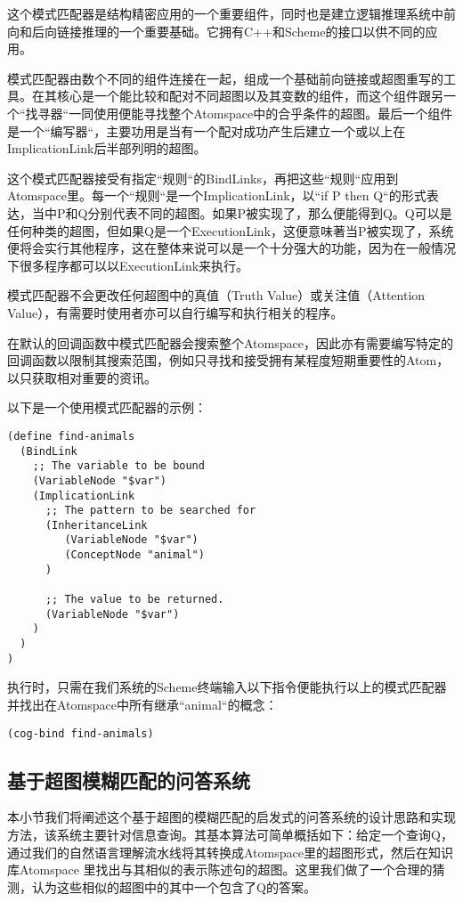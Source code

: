 这个模式匹配器是结构精密应用的一个重要组件，同时也是建立逻辑推理系统中前向和后向链接推理的一个重要基础。它拥有C++和Scheme的接口以供不同的应用。

模式匹配器由数个不同的组件连接在一起，组成一个基础前向链接或超图重写的工具。在其核心是一个能比较和配对不同超图以及其变数的组件，而这个组件跟另一个“找寻器“一同使用便能寻找整个Atomspace中的合乎条件的超图。最后一个组件是一个“编写器“，主要功用是当有一个配对成功产生后建立一个或以上在ImplicationLink后半部列明的超图。

这个模式匹配器接受有指定“规则“的BindLinks，再把这些“规则“应用到Atomspace里。每一个“规则“是一个ImplicationLink，以“if P then Q“的形式表达，当中P和Q分别代表不同的超图。如果P被实现了，那么便能得到Q。Q可以是任何种类的超图，但如果Q是一个ExecutionLink，这便意味著当P被实现了，系统便将会实行其他程序，这在整体来说可以是一个十分强大的功能，因为在一般情况下很多程序都可以以ExecutionLink来执行。

模式匹配器不会更改任何超图中的真值（Truth Value）或关注值（Attention Value），有需要时使用者亦可以自行编写和执行相关的程序。

在默认的回调函数中模式匹配器会搜索整个Atomspace，因此亦有需要编写特定的回调函数以限制其搜索范围，例如只寻找和接受拥有某程度短期重要性的Atom，以只获取相对重要的资讯。

以下是一个使用模式匹配器的示例：

\begin{verbatim}
(define find-animals
  (BindLink
    ;; The variable to be bound
    (VariableNode "$var")
    (ImplicationLink
      ;; The pattern to be searched for
      (InheritanceLink
         (VariableNode "$var")
         (ConceptNode "animal")
      )

      ;; The value to be returned.
      (VariableNode "$var")
    )
  )
)
 \end{verbatim}

执行时，只需在我们系统的Scheme终端输入以下指令便能执行以上的模式匹配器并找出在Atomspace中所有继承“animal“的概念：

\begin{verbatim}
(cog-bind find-animals)
\end{verbatim}

\subsection{基于超图模糊匹配的问答系统}

本小节我们将阐述这个基于超图的模糊匹配的启发式的问答系统的设计思路和实现方法，该系统主要针对信息查询。其基本算法可简单概括如下：给定一个查询Q，通过我们的自然语言理解流水线将其转换成Atomspace里的超图形式，然后在知识库Atomspace 里找出与其相似的表示陈述句的超图。这里我们做了一个合理的猜测，认为这些相似的超图中的其中一个包含了Q的答案。

